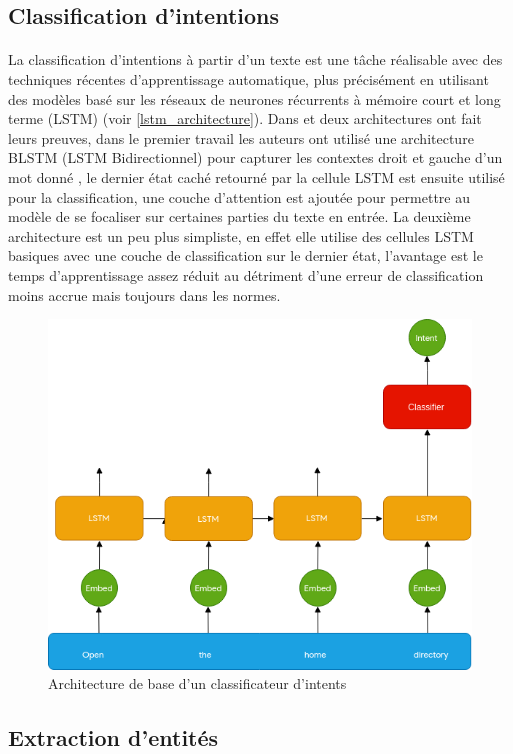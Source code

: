 	\subsection{Classification d'intentions}
		\paragraph{}
		La classification d'intentions à partir d'un texte est une tâche réalisable avec des techniques récentes d'apprentissage automatique, plus précisément en utilisant des modèles basé sur les réseaux de neurones récurrents à mémoire court et long terme (LSTM) (voir \ref{lstm_architecture}). Dans \cite{intent_classification} et \cite{intent_slots} deux architectures ont fait leurs preuves, dans le premier travail les auteurs ont utilisé une architecture BLSTM (LSTM Bidirectionnel) pour capturer les contextes droit et gauche d'un mot donné \cite{blstm}, le dernier état caché retourné par la cellule LSTM est ensuite utilisé pour la classification, une couche d'attention est ajoutée \cite{attention_mechanism} pour permettre au modèle de se focaliser sur certaines parties du texte en entrée. La deuxième architecture est un peu plus simpliste, en effet elle utilise des cellules LSTM basiques avec une couche de classification sur le dernier état, l'avantage est le temps d'apprentissage assez réduit au détriment d'une erreur de classification moins accrue mais toujours dans les normes.
		\begin{figure}[H]
			\centering
			\label{LSTM_intent}
			\includegraphics[width=0.65\linewidth]{images/NLU/intent_classification.png}
			\caption{Architecture de base d'un classificateur d'intents \cite{intent_classification}}
		\end{figure}
	\subsection{Extraction d'entités}
